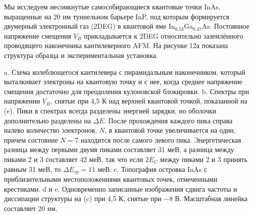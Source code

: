 \documentclass[a4paper,14pt]{extarticle}
\begin{document}
Мы исследуем несомкнутые самособирающиеся квантовые точки InAs, выращенные на 20 нм туннельном барьере InP, под которым формируется двумерный электронный газ (2DEG) в квантовой яме In$_{0.53}$Ga$_{0.47}$As. Постоянное напряжение смещения $V_B$ прикладывается к 2DEG относительно заземлённого проводящего наконечника кантилеверного AFM. На рисунке 12а показана структура образца и экспериментальная установка.

a. Схема колеблющегося кантилевера с пирамидальным наконечником, который выталкивает электроны на квантовую точку и с нее, когда среднее напряжение смещения достаточно для преодоления кулоновской блокировки. b. Спектры при напряжении $V_B$, снятые при 4,5 К над верхней квантовой точкой, показанной на (e). Пики в спектрах всегда разделены энергией зарядки, но оболочки дополнительно разделены на $\Delta E$. После прохождения каждого пика справа налево количество электронов, $N$, в квантовой точке увеличивается на один, причем состояние $N = 7$ находится после самого левого пика. Энергетическая разница между первыми двумя пиками составляет 31 меВ, а разница между пиками 2 и 3 составляет 42 меВ, так что если $2E_C$ между пиками 2 и 3 принять равным 31 меВ, то $\Delta E_{sp} = 11$ меВ. c. Топография островка InAs с приблизительными местоположениями квантовых точек, отмеченными крестиками. d и e. Одновременно записанные изображения сдвига частоты и диссипации структуры на (c) при 4,5 К, снятые при $-8$ В. Масштабная линейка составляет 20 нм.
\end{document}
